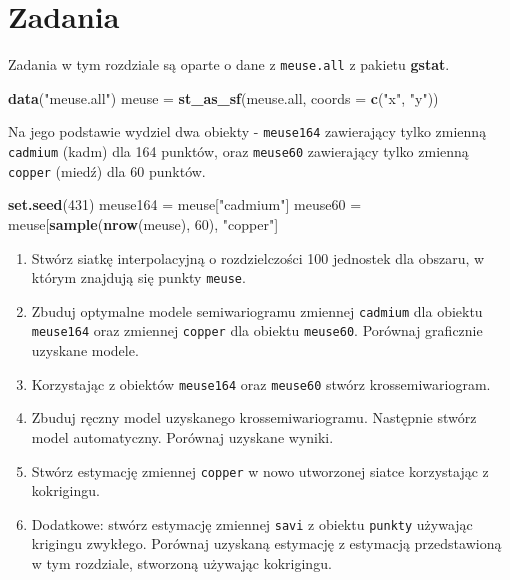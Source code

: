 \documentclass[
  paper=6in:9in,pagesize=pdftex,headinclude=on,footinclude=on,10pt]{scrbook}
\newenvironment{Shaded}{\begin{snugshade}}{\end{snugshade}}
\newcommand{\AttributeTok}[1]{\textcolor[rgb]{0.13,0.29,0.53}{#1}}
\newcommand{\DecValTok}[1]{\textcolor[rgb]{0.00,0.00,0.81}{#1}}
\newcommand{\FunctionTok}[1]{\textcolor[rgb]{0.13,0.29,0.53}{\textbf{#1}}}
\newcommand{\NormalTok}[1]{#1}
\newcommand{\OtherTok}[1]{\textcolor[rgb]{0.56,0.35,0.01}{#1}}
\newcommand{\StringTok}[1]{\textcolor[rgb]{0.31,0.60,0.02}{#1}}
\providecommand{\tightlist}{%
  \setlength{\itemsep}{0pt}\setlength{\parskip}{0pt}}
\begin{document}
\section{Zadania}\label{z10}

Zadania w tym rozdziale są oparte o dane z \texttt{meuse.all} z pakietu \textbf{gstat}.

\begin{Shaded}
\begin{Highlighting}[]
\FunctionTok{data}\NormalTok{(}\StringTok{"meuse.all"}\NormalTok{)}
\NormalTok{meuse }\OtherTok{=} \FunctionTok{st\_as\_sf}\NormalTok{(meuse.all, }\AttributeTok{coords =} \FunctionTok{c}\NormalTok{(}\StringTok{"x"}\NormalTok{, }\StringTok{"y"}\NormalTok{))}
\end{Highlighting}
\end{Shaded}

Na jego podstawie wydziel dwa obiekty - \texttt{meuse164} zawierający tylko zmienną \texttt{cadmium} (kadm) dla 164 punktów, oraz \texttt{meuse60} zawierający tylko zmienną \texttt{copper} (miedź) dla 60 punktów.

\begin{Shaded}
\begin{Highlighting}[]
\FunctionTok{set.seed}\NormalTok{(}\DecValTok{431}\NormalTok{)}
\NormalTok{meuse164 }\OtherTok{=}\NormalTok{ meuse[}\StringTok{"cadmium"}\NormalTok{]}
\NormalTok{meuse60 }\OtherTok{=}\NormalTok{ meuse[}\FunctionTok{sample}\NormalTok{(}\FunctionTok{nrow}\NormalTok{(meuse), }\DecValTok{60}\NormalTok{), }\StringTok{"copper"}\NormalTok{]}
\end{Highlighting}
\end{Shaded}

\begin{enumerate}
\def\labelenumi{\arabic{enumi}.}
\tightlist
\item
  Stwórz siatkę interpolacyjną o rozdzielczości 100 jednostek dla obszaru, w którym znajdują się punkty \texttt{meuse}.
\item
  Zbuduj optymalne modele semiwariogramu zmiennej \texttt{cadmium} dla obiektu \texttt{meuse164} oraz zmiennej \texttt{copper} dla obiektu \texttt{meuse60}.
  Porównaj graficznie uzyskane modele.
\item
  Korzystając z obiektów \texttt{meuse164} oraz \texttt{meuse60} stwórz krossemiwariogram.
\item
  Zbuduj ręczny model uzyskanego krossemiwariogramu.
  Następnie stwórz model automatyczny.
  Porównaj uzyskane wyniki.
\item
  Stwórz estymację zmiennej \texttt{copper} w nowo utworzonej siatce korzystając z kokrigingu.
\item
  Dodatkowe: stwórz estymację zmiennej \texttt{savi} z obiektu \texttt{punkty} używając krigingu zwykłego.
  Porównaj uzyskaną estymację z estymacją przedstawioną w tym rozdziale, stworzoną używając kokrigingu.
\end{enumerate}
\end{document}
